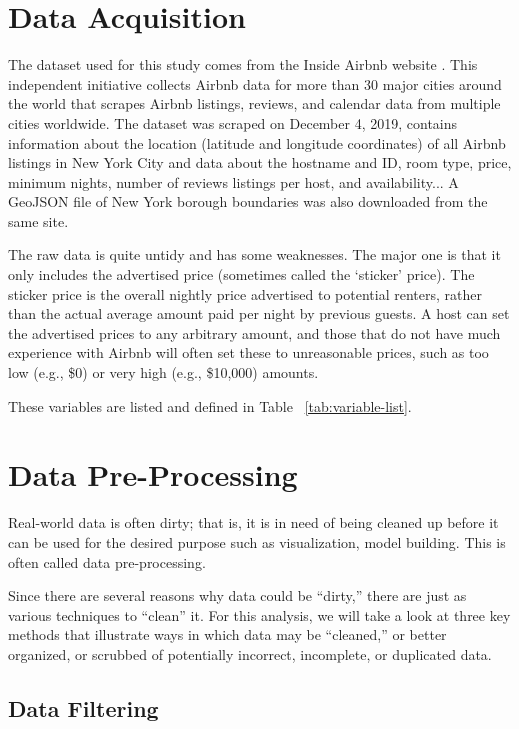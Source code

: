 \section{Data Acquisition}
\label{sec:data_acquisition}

The dataset used for this study comes from the Inside Airbnb website
\textcite{Airbnb}. This independent initiative collects Airbnb data for more than 30
major cities around the world that scrapes Airbnb listings, reviews, and
calendar data from multiple cities worldwide. The dataset  was scraped on
December 4, 2019, contains information about the location (latitude and
longitude coordinates) of all Airbnb listings in New York City and data about
the hostname and ID, room type, price, minimum nights, number of reviews
listings per host, and availability... A GeoJSON file of New York borough
boundaries was also downloaded from the same site.

The raw data is quite untidy and has some weaknesses. The major one is that it
only includes the advertised price (sometimes called the ‘sticker’ price). The
sticker price is the overall nightly price advertised to potential renters,
rather than the actual average amount paid per night by previous guests. A host
can set the advertised prices to any arbitrary amount, and those that do not
have much experience with Airbnb will often set these to unreasonable prices,
such as too low (e.g., \$0) or very high (e.g., \$10,000) amounts.

These variables are listed and defined in Table ~\ref{tab:variable-list}.

\section{Data Pre-Processing }
\label{sec:data_cleaning}

Real-world data is often dirty; that is, it is in need of being cleaned up
before it can be used for the desired purpose such as visualization, model
building. This is often called data pre-processing.

Since there are several reasons why data could be “dirty,” there are just as
various techniques to “clean” it.  For this analysis, we will take a look at
three key methods that illustrate ways in which data may be “cleaned,” or better
organized, or scrubbed of potentially incorrect, incomplete, or duplicated data.

\subsection{Data Filtering}

